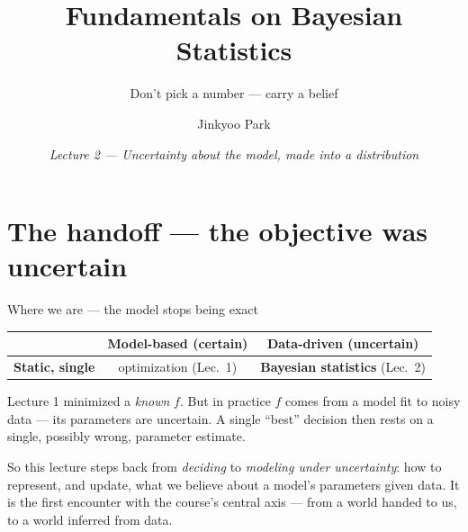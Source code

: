 \documentclass[10pt, aspectratio=169]{beamer}
\title{Fundamentals on Bayesian Statistics}
\subtitle{Don't pick a number --- carry a belief}
\author{Jinkyoo Park}
\institute{KAIST}
\date{\textit{Lecture 2 --- Uncertainty about the model, made into a distribution}}
\begin{document}
\maketitle

\section{The handoff --- the objective was uncertain}

\begin{frame}{Where we are --- the model stops being exact}
\vspace{2pt}
\begin{center}\footnotesize\renewcommand{\arraystretch}{1.5}
\begin{tabular}{r|c|c}
 & \textbf{Model-based (certain)} & \textbf{Data-driven (uncertain)} \\
\hline
\textbf{Static, single}  & optimization \scriptsize(Lec.\ 1) & \cellcolor{mDarkTeal!20}\textbf{Bayesian statistics} \scriptsize(\alert{Lec.\ 2})\\
\end{tabular}
\end{center}
\smallskip

Lecture 1 minimized a \emph{known} $f$. But in practice $f$ comes from a \alert{model fit to noisy data} --- its parameters are uncertain. A single ``best'' decision then rests on a single, possibly wrong, parameter estimate.
\smallskip

\pause
So this lecture steps back from \emph{deciding} to \emph{modeling under uncertainty}: how to represent, and update, what we believe about a model's parameters given data. It is the first encounter with the course's central axis --- \alert{from a world handed to us, to a world inferred from data}.
\end{frame}
\end{document}

